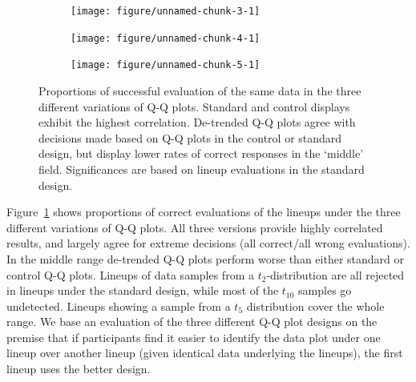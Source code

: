 \documentclass{article}\usepackage[]{graphicx}\usepackage[]{color}
\newenvironment{knitrout}{}{} %
\begin{document}
\begin{figure}
\centering
\begin{subfigure}[b]{.3\textwidth}
\begin{knitrout}
\color{fgcolor}
\texttt{[image: figure/unnamed-chunk-3-1]} 

\end{knitrout}
\end{subfigure}
\begin{subfigure}[b]{.3\textwidth}
\begin{knitrout}
\color{fgcolor}
\texttt{[image: figure/unnamed-chunk-4-1]} 

\end{knitrout}
\end{subfigure}
\begin{subfigure}[b]{.3\textwidth}
\begin{knitrout}
\color{fgcolor}
\texttt{[image: figure/unnamed-chunk-5-1]} 

\end{knitrout}
\end{subfigure}
\caption{\label{fig:compare}Proportions of successful evaluation of the same data in the three different variations of Q-Q plots. Standard and control displays exhibit the highest correlation. De-trended Q-Q plots agree with decisions made based on Q-Q plots in the control or standard design, but display lower rates of correct responses in the `middle' field. Significances are based on lineup evaluations in the standard design. }
\end{figure}



Figure~\ref{fig:compare} shows proportions of correct evaluations of the lineups under the three different variations of Q-Q plots. All three versions provide highly correlated results, and largely agree for extreme decisions (all correct/all wrong evaluations). In the middle range de-trended Q-Q plots perform  worse than either standard or control Q-Q plots. Lineups of data samples from a $t_2$-distribution  are all rejected in lineups under the standard design, while most of the $t_{10}$ samples go undetected. Lineups showing a sample from a $t_5$ distribution cover the whole range.
We base an evaluation of the three different Q-Q plot designs on the premise that if participants find it easier to identify the data plot under one lineup over another lineup (given identical data underlying the lineups), the first lineup uses the better design.
\end{document}
